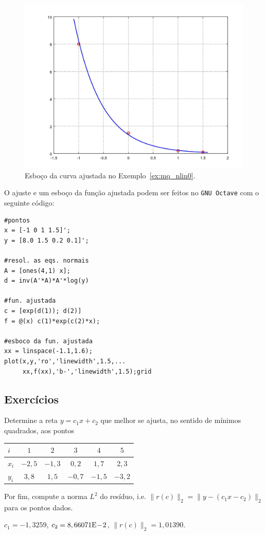 \begin{ex}
\begin{figure}[h]
  \centering
  \includegraphics[width=\textwidth]{cap_ajuste/dados/ex_mq_nlin0/ex_mq_nlin0}
  \caption{Esboço da curva ajustada no Exemplo~\ref{ex:mq_nlin0}.}
  \label{fig:ex_mq_nlin0}
\end{figure}

\ifisoctave
O ajuste e um esboço da função ajustada podem ser feitos no \verb+GNU Octave+ com o seguinte código:
\begin{verbatim}
#pontos
x = [-1 0 1 1.5]';
y = [8.0 1.5 0.2 0.1]';

#resol. as eqs. normais
A = [ones(4,1) x];
d = inv(A'*A)*A'*log(y)

#fun. ajustada
c = [exp(d(1)); d(2)]
f = @(x) c(1)*exp(c(2)*x);

#esboco da fun. ajustada
xx = linspace(-1.1,1.6);
plot(x,y,'ro','linewidth',1.5,...
     xx,f(xx),'b-','linewidth',1.5);grid
\end{verbatim}
\fi

\end{ex}

\subsection*{Exercícios}

\begin{exer}\label{exer:mq_reta}
  Determine a reta $y = c_1x + c_2$ que melhor se ajusta, no sentido de mínimos quadrados, aos pontos
  \begin{center}
    \begin{tabular}{l|ccccc}
      $i$ & $1$ & $2$ & $3$ & $4$ & $5$ \\\hline
      $x_i$ & $-2,5$ & $-1,3$ & $0,2$ & $1,7$ & $2,3$\\
      $y_i$ & $3,8$ & $1,5$ & $-0,7$ & $-1,5$ & $-3,2$\\\hline
    \end{tabular}
  \end{center}
Por fim, compute a norma $L^2$ do resíduo, i.e. $\|r(c)\|_2 = \|y - (c_1x - c_2)\|_2$ para os pontos dados.
\end{exer}
\begin{resp}
  $c_1 = -1,3259$, $c_2 = 8,66071\mathrm{E}\!-\!2$, $\|r(c)\|_2 = 1,01390$.
\end{resp}


